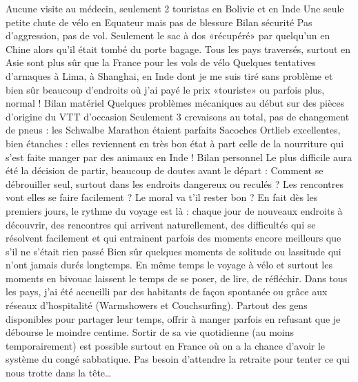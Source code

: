  Aucune visite au médecin, seulement 2 touristas en Bolivie et en Inde \newline
 Une seule petite chute de vélo en Equateur mais pas de blessure \newline
 Bilan sécurité \newline
 Pas d'aggression, pas de vol. Seulement le sac à dos «récupéré» par quelqu'un en Chine alors qu'il était tombé du porte bagage. Tous les pays traversés, surtout en Asie sont plus sûr que la France pour les vols de vélo \newline
 Quelques tentatives d'arnaques à Lima, à Shanghai, en Inde dont je me suis tiré sans problème et bien sûr beaucoup d'endroits où j'ai payé le prix «touriste» ou parfois plus, normal ! \newline
 Bilan matériel \newline
 Quelques problèmes mécaniques au début sur des pièces d'origine du VTT d'occasion \newline
 Seulement 3 crevaisons au total, pas de changement de pneus : les Schwalbe Marathon étaient parfaits \newline
 Sacoches Ortlieb excellentes, bien étanches : elles reviennent en très bon état à part celle de la nourriture qui s'est faite manger par des animaux en Inde ! \newline
 Bilan personnel \newline
 Le plus difficile aura été la décision de partir, beaucoup de doutes avant le départ : Comment se débrouiller seul, surtout dans les endroits dangereux ou reculés ? Les rencontres vont elles se faire facilement ? Le moral va t'il rester bon ? \newline
 En fait dès les premiers jours, le rythme du voyage est là : chaque jour de nouveaux endroits à découvrir, des rencontres qui arrivent naturellement, des difficultés qui se résolvent facilement et qui entrainent parfois des moments encore meilleurs que s'il ne s'était rien passé \newline
 Bien sûr quelques moments de solitude ou lassitude qui n'ont jamais durés longtemps. En même temps le voyage à vélo et surtout les moments en bivouac laissent le temps de se poser, de lire, de réfléchir. \newline
 Dans tous les pays, j'ai été accueilli par des habitants de façon spontanée ou grâce aux réseaux d'hospitalité (Warmshowers et Couchsurfing). Partout des gens disponibles pour partager leur temps, offrir à manger parfois en refusant que je débourse le moindre centime. \newline
 Sortir de sa vie quotidienne (au moins temporairement) est possible surtout en France où on a la chance d'avoir le système du congé sabbatique. Pas besoin d'attendre la retraite pour tenter ce qui nous trotte dans la tête… \newline

\newpage
 
